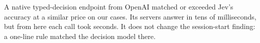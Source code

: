 \begin{table}[htbp]\centering\footnotesize\setlength\tabcolsep{4pt}
\caption{OpenAI Decisions API (post hoc) against the in-run Jev reference: correct decisions, wrong automatic actions,
coverage, client latency (from our machine, slow network in this run) and dollars per million decisions.}\label{tab:openai}
\end{table}
\begin{keyidea}
A native typed-decision endpoint from OpenAI matched or exceeded Jev's accuracy at a similar price on our cases. Its
servers answer in tens of milliseconds, but from here each call took seconds. It does not change the session-start
finding: a one-line rule matched the decision model there.
\end{keyidea}
